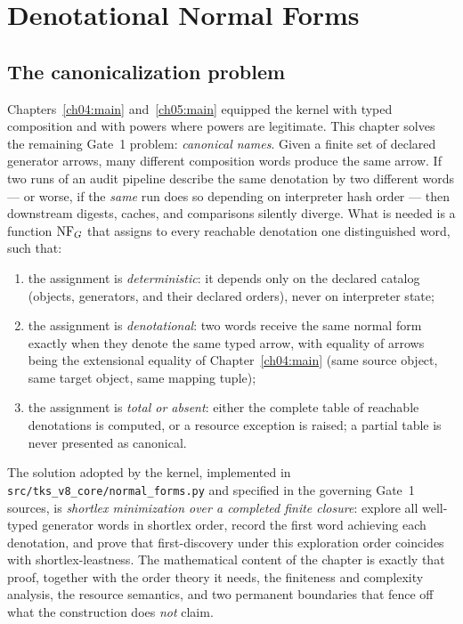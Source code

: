 \chapter{Denotational Normal Forms}\label{ch08:chap}

\section{The canonicalization problem}\label{ch08:sec:problem}

Chapters~\ref{ch04:main} and~\ref{ch05:main} equipped the kernel with typed
composition and with powers where powers are legitimate. This chapter solves
the remaining Gate~1 problem: \emph{canonical names}. Given a finite set of
declared generator arrows, many different composition words produce the same
arrow. If two runs of an audit pipeline describe the same denotation by two
different words --- or worse, if the \emph{same} run does so depending on
interpreter hash order --- then downstream digests, caches, and comparisons
silently diverge. What is needed is a function $\mathrm{NF}_G$ that assigns to every
reachable denotation one distinguished word, such that:

\begin{enumerate}
\item the assignment is \emph{deterministic}: it depends only on the declared
  catalog (objects, generators, and their declared orders), never on
  interpreter state;
\item the assignment is \emph{denotational}: two words receive the same
  normal form exactly when they denote the same typed arrow, with equality of
  arrows being the extensional equality of
  Chapter~\ref{ch04:main} (same source object, same target object, same
  mapping tuple);
\item the assignment is \emph{total or absent}: either the complete table of
  reachable denotations is computed, or a resource exception is raised; a
  partial table is never presented as canonical.
\end{enumerate}

The solution adopted by the kernel, implemented in
\texttt{src/tks\_v8\_core/normal\_forms.py} and specified in the governing
Gate~1 sources, is \emph{shortlex minimization over a completed finite
closure}: explore all well-typed generator words in shortlex order, record
the first word achieving each denotation, and prove that first-discovery
under this exploration order coincides with shortlex-leastness. The
mathematical content of the chapter is exactly that proof, together with the
order theory it needs, the finiteness and complexity analysis, the resource
semantics, and two permanent boundaries that fence off what the construction
does \emph{not} claim.

